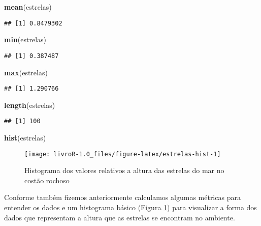 \documentclass[14pt,titlepage, oneside, openany, a4paper]{book}
\newenvironment{Shaded}{\begin{snugshade}}{\end{snugshade}}
\newcommand{\KeywordTok}[1]{\textcolor[rgb]{0.13,0.29,0.53}{\textbf{#1}}}
\newcommand{\NormalTok}[1]{#1}
\begin{document}
\begin{Shaded}
\begin{Highlighting}[]
\KeywordTok{mean}\NormalTok{(estrelas)}
\end{Highlighting}
\end{Shaded}

\begin{verbatim}
## [1] 0.8479302
\end{verbatim}

\begin{Shaded}
\begin{Highlighting}[]
\KeywordTok{min}\NormalTok{(estrelas)}
\end{Highlighting}
\end{Shaded}

\begin{verbatim}
## [1] 0.387487
\end{verbatim}

\begin{Shaded}
\begin{Highlighting}[]
\KeywordTok{max}\NormalTok{(estrelas)}
\end{Highlighting}
\end{Shaded}

\begin{verbatim}
## [1] 1.290766
\end{verbatim}

\begin{Shaded}
\begin{Highlighting}[]
\KeywordTok{length}\NormalTok{(estrelas)}
\end{Highlighting}
\end{Shaded}

\begin{verbatim}
## [1] 100
\end{verbatim}

\begin{Shaded}
\begin{Highlighting}[]
\KeywordTok{hist}\NormalTok{(estrelas)}
\end{Highlighting}
\end{Shaded}

\begin{figure}[H]
\texttt{[image: livroR-1.0\_files/figure-latex/estrelas-hist-1]} \caption{Histograma dos valores relativos a altura das estrelas do mar no costão rochoso}\label{fig:estrelas-hist}
\end{figure}

Conforme também fizemos anteriormente calculamos algumas métricas para entender os dados e um histograma básico (Figura \ref{fig:estrelas-hist}) para visualizar a forma dos dados que representam a altura que as estrelas se encontram no ambiente.
\end{document}
